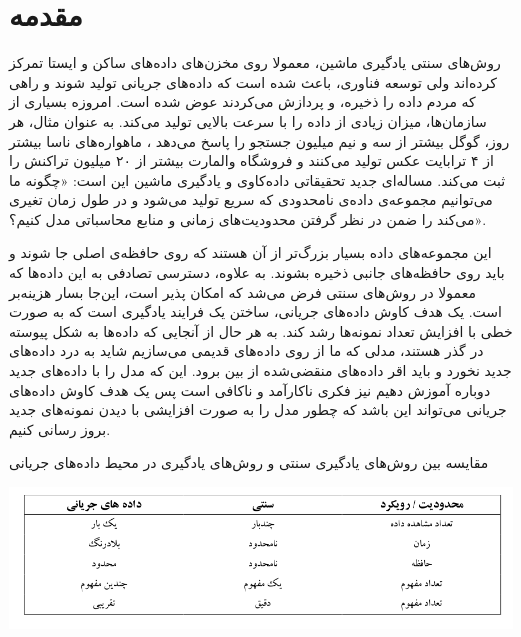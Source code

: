 
\chapter{مقدمه}
\thispagestyle{empty}
روش‌های سنتی یادگیری ماشین، معمولا روی مخزن‌های داده‌های ساکن و ایستا تمرکز کرده‌اند ولی توسعه فناوری، باعث شده است که داده‌های جریانی تولید شوند و راهی که مردم داده را ذخیره، و پردازش می‌کردند عوض شده است. امروزه بسیاری از سازمان‌ها، میزان زیادی از داده را با سرعت بالایی تولید می‌کند. به عنوان مثال، هر روز، گوگل بیشتر از سه و نیم میلیون جستجو را پاسخ می‌دهد
، ماهواره‌های ناسا بیشتر از ۴ ترابایت عکس تولید می‌کنند
 و فروشگاه والمارت بیشتر از ۲۰ میلیون تراکنش را ثبت می‌کند. مساله‌ای جدید تحقیقاتی داده‌کاوی و یادگیری ماشین این است: «چگونه ما می‌توانیم مجموعه‌ی داده‌ی نامحدودی که سریع تولید می‌شود و در طول زمان تغیری می‌کند را ضمن در نظر گرفتن محدودیت‌های زمانی و منابع محاسباتی مدل کنیم؟».

این مجموعه‌های داده بسیار بزرگ‌تر از آن هستند که روی حافظه‌ی اصلی جا شوند و باید روی حافظه‌های جانبی ذخیره بشوند. به علاوه، دسترسی تصادفی به این‌ داده‌ها که معمولا در روش‌های سنتی فرض می‌شد که امکان پذیر است، این‌جا بسار هزینه‌بر است. یک هدف کاوش داده‌های جریانی، ساختن یک فرایند یادگیری است که به صورت خطی با افزایش تعداد نمونه‌ها رشد کند. به هر حال از آنجایی که داده‌ها به شکل پیوسته در گذر هستند، مدلی که ما از روی داده‌های قدیمی می‌سازیم شاید به درد داده‌های جدید نخورد و باید اقر داده‌های منقضی‌شده از بین برود. این که مدل را با داده‌های جدید دوباره آموزش دهیم نیز فکری ناکارآمد و ناکافی است پس یک هدف کاوش داده‌های جریانی می‌تواند این باشد که چطور مدل را به صورت افزایشی با دیدن نمونه‌های جدید بروز رسانی کنیم.

\begin{table}
  \caption{مقایسه بین روش‌های یادگیری سنتی و روش‌های یادگیری در محیط داده‌های جریانی}
  \label{tbl:bound}
  \includegraphics[width=\linewidth]{bound}
\end{table}


